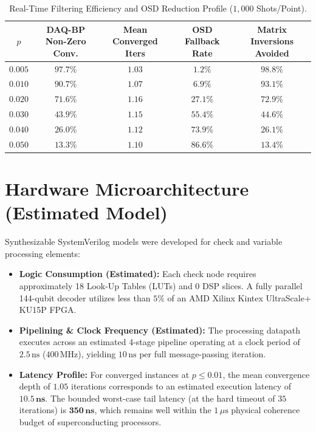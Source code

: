 \documentclass[aps,prxquantum,reprint,twocolumn,superscriptaddress,nofootinbib]{revtex4-2}
\begin{document}
\begin{table}[t]
\centering
\caption{Real-Time Filtering Efficiency and OSD Reduction Profile ($1,000$ Shots/Point).}
\label{tab:conv_results}
\begin{tabular}{ccccc}
\toprule
$p$ & DAQ-BP Non-Zero Conv. & Mean Converged Iters & OSD Fallback Rate & Matrix Inversions Avoided \\
\midrule
$0.005$ & $\mathbf{97.7\%}$ & $\mathbf{1.03}$ & $\mathbf{1.2\%}$ & $\mathbf{98.8\%}$ \\
$0.010$ & $\mathbf{90.7\%}$ & $\mathbf{1.07}$ & $\mathbf{6.9\%}$ & $\mathbf{93.1\%}$ \\
$0.020$ & $\mathbf{71.6\%}$ & $\mathbf{1.16}$ & $27.1\%$ & $\mathbf{72.9\%}$ \\
$0.030$ & $43.9\%$ & $1.15$ & $55.4\%$ & $44.6\%$ \\
$0.040$ & $26.0\%$ & $1.12$ & $73.9\%$ & $26.1\%$ \\
$0.050$ & $13.3\%$ & $1.10$ & $86.6\%$ & $13.4\%$ \\
\bottomrule
\end{tabular}
\end{table}

\section{Hardware Microarchitecture (Estimated Model)}
Synthesizable SystemVerilog models were developed for check and variable processing elements:
\begin{itemize}
    \item \textbf{Logic Consumption (Estimated):} Each check node requires approximately 18 Look-Up Tables (LUTs) and 0 DSP slices. A fully parallel 144-qubit decoder utilizes less than $5\%$ of an AMD Xilinx Kintex UltraScale+ KU15P FPGA.
    \item \textbf{Pipelining \& Clock Frequency (Estimated):} The processing datapath executes across an estimated 4-stage pipeline operating at a clock period of $2.5\,\text{ns}$ ($400\,\text{MHz}$), yielding $10\,\text{ns}$ per full message-passing iteration.
    \item \textbf{Latency Profile:} For converged instances at $p \le 0.01$, the mean convergence depth of $1.05$ iterations corresponds to an estimated execution latency of $\mathbf{10.5\,\text{ns}}$. The bounded worst-case tail latency (at the hard timeout of $35$ iterations) is $\mathbf{350\,\text{ns}}$, which remains well within the $1\,\mu\text{s}$ physical coherence budget of superconducting processors.
\end{itemize}
\end{document}
